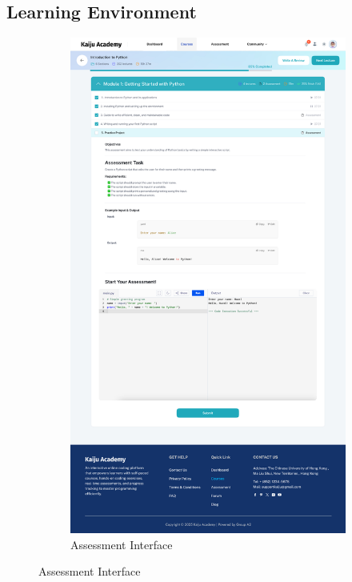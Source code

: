 \documentclass[a4paper, 11pt]{scrreprt}
\begin{document}
\subsection{Learning Environment}
\begin{figure}[ht]
    \centering
    \begin{subfigure}[b]{0.47\textwidth}
        \centering
        \includegraphics[width=\textwidth]{UI/Assessment.jpg}
        \caption{Assessment Interface}
    \end{subfigure}

\end{figure}
\end{document}
